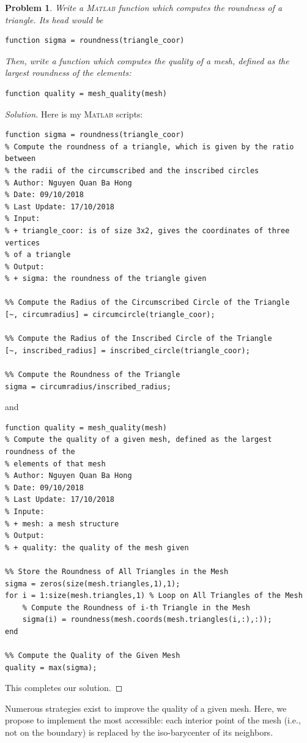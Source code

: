 \documentclass[11pt,a4paper,center,notitlepage]{article}
\numberwithin{equation}{section}
\newtheorem{prob}{Problem}[section]
\begin{document}
\begin{prob}
Write a \textsc{Matlab} function which computes the roundness of a triangle. Its head would be
\begin{verbatim}
function sigma = roundness(triangle_coor)
\end{verbatim}
Then, write a function which computes the quality of a mesh, defined as the largest roundness of the elements:
\begin{verbatim}
function quality = mesh_quality(mesh)
\end{verbatim}
\end{prob}

\begin{proof}[Solution]
Here is my \textsc{Matlab} scripts:
\begin{verbatim}
function sigma = roundness(triangle_coor)
% Compute the roundness of a triangle, which is given by the ratio between
% the radii of the circumscribed and the inscribed circles
% Author: Nguyen Quan Ba Hong
% Date: 09/10/2018
% Last Update: 17/10/2018
% Input:
% + triangle_coor: is of size 3x2, gives the coordinates of three vertices
% of a triangle
% Output:
% + sigma: the roundness of the triangle given

%% Compute the Radius of the Circumscribed Circle of the Triangle 
[~, circumradius] = circumcircle(triangle_coor);

%% Compute the Radius of the Inscribed Circle of the Triangle
[~, inscribed_radius] = inscribed_circle(triangle_coor);

%% Compute the Roundness of the Triangle
sigma = circumradius/inscribed_radius;
\end{verbatim}
and
\begin{verbatim}
function quality = mesh_quality(mesh)
% Compute the quality of a given mesh, defined as the largest roundness of the
% elements of that mesh
% Author: Nguyen Quan Ba Hong
% Date: 09/10/2018
% Last Update: 17/10/2018
% Inpute:
% + mesh: a mesh structure
% Output:
% + quality: the quality of the mesh given

%% Store the Roundness of All Triangles in the Mesh
sigma = zeros(size(mesh.triangles,1),1);
for i = 1:size(mesh.triangles,1) % Loop on All Triangles of the Mesh
    % Compute the Roundness of i-th Triangle in the Mesh
    sigma(i) = roundness(mesh.coords(mesh.triangles(i,:),:)); 
end

%% Compute the Quality of the Given Mesh
quality = max(sigma);
\end{verbatim}
This completes our solution.
\end{proof}
Numerous strategies exist to improve the quality of a given mesh. Here, we propose to implement the most accessible: each interior point of the mesh (i.e., not on the boundary) is replaced by the iso-barycenter of its neighbors.
\end{document}
